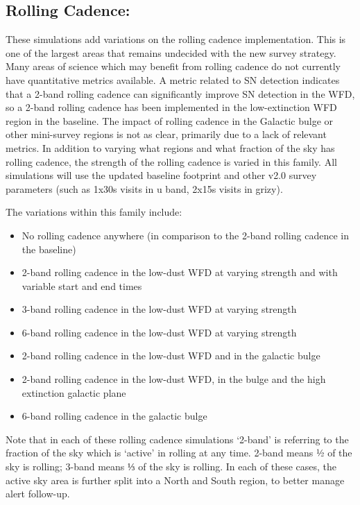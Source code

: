\subsection{Rolling Cadence:}
These simulations add variations on the rolling cadence implementation. This is one of the largest areas that remains undecided with the new survey strategy. Many areas of science which may benefit from rolling cadence do not currently have quantitative metrics available. A metric related to SN detection indicates that a 2-band rolling cadence can significantly improve SN detection in the WFD, so a 2-band rolling cadence has been implemented in the low-extinction WFD region in the baseline. The impact of rolling cadence in the Galactic bulge or other mini-survey regions is not as clear, primarily due to a lack of relevant metrics. In addition to varying what regions and what fraction of the sky has rolling cadence, the strength of the rolling cadence is varied in this family. All simulations will use the updated baseline footprint 
and other v2.0 survey parameters (such as 1x30s visits in u band, 2x15s visits in grizy). 

The variations within this family include:
\begin{itemize}
\item No rolling cadence anywhere (in comparison to the 2-band rolling cadence in the baseline) %
\item 2-band rolling cadence in the low-dust WFD at varying strength and with variable start and end times %
\item 3-band rolling cadence in the low-dust WFD at varying strength %
\item 6-band rolling cadence in the low-dust WFD at varying strength %
\item 2-band rolling cadence in the low-dust WFD and in the galactic bulge %
\item 2-band rolling cadence in the low-dust WFD, in the bulge and the high extinction galactic plane %
\item 6-band rolling cadence in the galactic bulge %
\end{itemize}
Note that in each of these rolling cadence simulations ‘2-band’ is referring to the fraction of the sky which is ‘active’ in rolling at any time. 2-band means ½ of the sky is rolling; 3-band means ⅓ of the sky is rolling. In each of these cases, the active sky area is further split into a North and South region, to better manage alert follow-up. 

